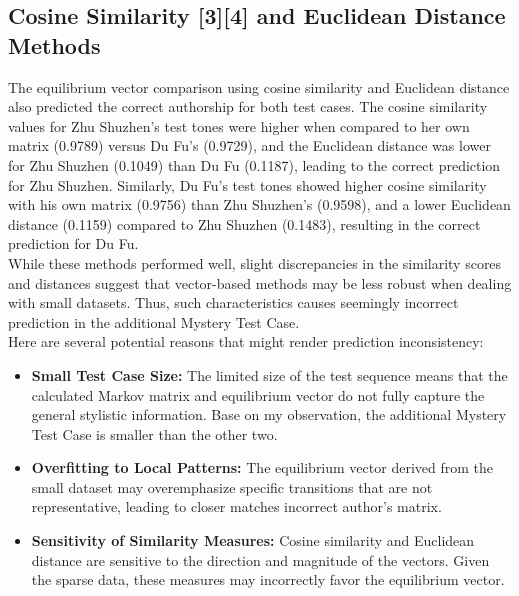 \documentclass[12pt]{article}
\begin{document}
\subsection*{Cosine Similarity [3][4] and Euclidean Distance Methods}
The equilibrium vector comparison using cosine similarity and Euclidean distance also predicted the correct authorship for both test cases. 
The cosine similarity values for Zhu Shuzhen's test tones were higher when compared to her own matrix (0.9789) versus Du Fu’s (0.9729), and the Euclidean distance was lower for Zhu Shuzhen (0.1049) than Du Fu (0.1187), leading to the correct prediction for Zhu Shuzhen. 
Similarly, Du Fu's test tones showed higher cosine similarity with his own matrix (0.9756) than Zhu Shuzhen's (0.9598), and a lower Euclidean distance (0.1159) compared to Zhu Shuzhen (0.1483), resulting in the correct prediction for Du Fu.
\\
While these methods performed well, slight discrepancies in the similarity scores and distances suggest that vector-based methods may be less robust when dealing with small datasets.
Thus, such characteristics causes seemingly incorrect prediction in the additional Mystery Test Case.
\\
\noindent Here are several potential reasons that might render prediction inconsistency:
\begin{itemize}
    \item \textbf{Small Test Case Size:} The limited size of the test sequence means that the calculated Markov matrix and equilibrium vector do not fully capture the general stylistic information. Base on my observation, the additional Mystery Test Case is smaller than the other two.
    \item \textbf{Overfitting to Local Patterns:} The equilibrium vector derived from the small dataset may overemphasize specific transitions that are not representative, leading to closer matches incorrect author's matrix.
    \item \textbf{Sensitivity of Similarity Measures:} Cosine similarity and Euclidean distance are sensitive to the direction and magnitude of the vectors. Given the sparse data, these measures may incorrectly favor the equilibrium vector.
\end{itemize}
\end{document}
